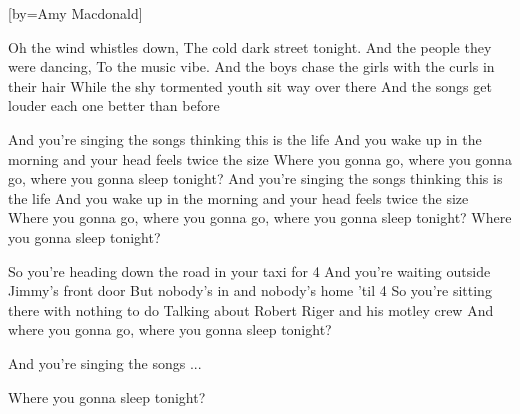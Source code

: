 

[by=Amy Macdonald]

\begin{LARGE}


\beginverse
Oh the wind whistles down, The cold dark street tonight.
And the people they were dancing, To the music vibe.
And the boys chase the girls with the curls in their hair
While the shy tormented youth sit way over there
And the songs get louder each one better than before
\endverse

\beginchorus
And you're singing the songs thinking this is the life
And you wake up in the morning and your head feels twice the size
Where you gonna go, where you gonna go, where you gonna sleep tonight?
And you're singing the songs thinking this is the life
And you wake up in the morning and your head feels twice the size
Where you gonna go, where you gonna go, where you gonna sleep tonight?
Where you gonna sleep tonight?
\endchorus

\beginverse
So you're heading down the road in your taxi for 4
And you're waiting outside Jimmy's front door
But nobody's in and nobody's home 'til 4
So you're sitting there with nothing to do
Talking about Robert Riger and his motley crew
And where you gonna go, where you gonna sleep tonight?
\endverse

\beginchorus
[3x]  And you're singing the songs ...
\endchorus

\beginchorus
Where you gonna sleep tonight?
\endchorus



\end{LARGE}


\chordson
\endsong
